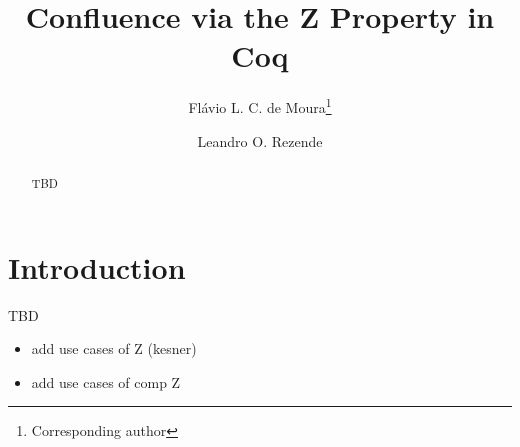 \documentclass[a4paper,UKenglish,cleveref, autoref, thm-restate,authorcolumns]{lipics-v2019}
\title{Confluence via the Z Property in Coq}
\author{Flávio L. C. de Moura\footnote{Corresponding author}}{Departamento de Ci\^encia da Computacao, Universidade de Brasilia \and
  \url{http://flaviomoura.mat.br}
}{flaviomoura@unb.br}{https://orcid.org/0000-0002-9390-5751}{}
\author{Leandro O. Rezende}{Departamento de }{L-ordo.ab.chao@hotmail.com}{}{}
\begin{document}
\maketitle

\begin{abstract}
  TBD
\end{abstract}

\section{Introduction}

TBD

\begin{itemize}
\item add use cases of Z (kesner)
\item add use cases of comp Z \cite{Nakazawa-Fujita2016}
\end{itemize}




\end{document}
